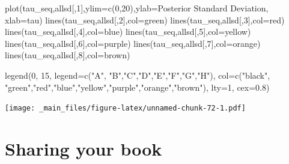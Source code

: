 \documentclass[
]{book}
\newenvironment{Shaded}{\begin{snugshade}}{\end{snugshade}}
\newcommand{\AttributeTok}[1]{\textcolor[rgb]{0.77,0.63,0.00}{#1}}
\newcommand{\DecValTok}[1]{\textcolor[rgb]{0.00,0.00,0.81}{#1}}
\newcommand{\FloatTok}[1]{\textcolor[rgb]{0.00,0.00,0.81}{#1}}
\newcommand{\FunctionTok}[1]{\textcolor[rgb]{0.00,0.00,0.00}{#1}}
\newcommand{\NormalTok}[1]{#1}
\newcommand{\StringTok}[1]{\textcolor[rgb]{0.31,0.60,0.02}{#1}}
\theoremstyle{definition}
\theoremstyle{definition}
\theoremstyle{definition}
\theoremstyle{definition}
\theoremstyle{remark}
\begin{document}
\begin{Shaded}
\begin{Highlighting}[]
\FunctionTok{plot}\NormalTok{(tau\_seq,allsd[,}\DecValTok{1}\NormalTok{],}\AttributeTok{ylim=}\FunctionTok{c}\NormalTok{(}\DecValTok{0}\NormalTok{,}\DecValTok{20}\NormalTok{),}\AttributeTok{ylab=}\StringTok{\textquotesingle{}Posterior Standard Deviation\textquotesingle{}}\NormalTok{, }\AttributeTok{xlab=}\StringTok{\textquotesingle{}tau\textquotesingle{}}\NormalTok{)}
\FunctionTok{lines}\NormalTok{(tau\_seq,allsd[,}\DecValTok{2}\NormalTok{],}\AttributeTok{col=}\StringTok{\textquotesingle{}green\textquotesingle{}}\NormalTok{)}
\FunctionTok{lines}\NormalTok{(tau\_seq,allsd[,}\DecValTok{3}\NormalTok{],}\AttributeTok{col=}\StringTok{\textquotesingle{}red\textquotesingle{}}\NormalTok{)}
\FunctionTok{lines}\NormalTok{(tau\_seq,allsd[,}\DecValTok{4}\NormalTok{],}\AttributeTok{col=}\StringTok{\textquotesingle{}blue\textquotesingle{}}\NormalTok{)}
\FunctionTok{lines}\NormalTok{(tau\_seq,allsd[,}\DecValTok{5}\NormalTok{],}\AttributeTok{col=}\StringTok{\textquotesingle{}yellow\textquotesingle{}}\NormalTok{)}
\FunctionTok{lines}\NormalTok{(tau\_seq,allsd[,}\DecValTok{6}\NormalTok{],}\AttributeTok{col=}\StringTok{\textquotesingle{}purple\textquotesingle{}}\NormalTok{)}
\FunctionTok{lines}\NormalTok{(tau\_seq,allsd[,}\DecValTok{7}\NormalTok{],}\AttributeTok{col=}\StringTok{\textquotesingle{}orange\textquotesingle{}}\NormalTok{)}
\FunctionTok{lines}\NormalTok{(tau\_seq,allsd[,}\DecValTok{8}\NormalTok{],}\AttributeTok{col=}\StringTok{\textquotesingle{}brown\textquotesingle{}}\NormalTok{)}

\FunctionTok{legend}\NormalTok{(}\DecValTok{0}\NormalTok{, }\DecValTok{15}\NormalTok{, }
       \AttributeTok{legend=}\FunctionTok{c}\NormalTok{(}\StringTok{"A"}\NormalTok{, }\StringTok{"B"}\NormalTok{,}\StringTok{"C"}\NormalTok{,}\StringTok{"D"}\NormalTok{,}\StringTok{"E"}\NormalTok{,}\StringTok{"F"}\NormalTok{,}\StringTok{"G"}\NormalTok{,}\StringTok{"H"}\NormalTok{),}
       \AttributeTok{col=}\FunctionTok{c}\NormalTok{(}\StringTok{"black"}\NormalTok{, }\StringTok{"green"}\NormalTok{,}\StringTok{"red"}\NormalTok{,}\StringTok{"blue"}\NormalTok{,}\StringTok{"yellow"}\NormalTok{,}\StringTok{"purple"}\NormalTok{,}\StringTok{"orange"}\NormalTok{,}\StringTok{"brown"}\NormalTok{), }\AttributeTok{lty=}\DecValTok{1}\NormalTok{, }\AttributeTok{cex=}\FloatTok{0.8}\NormalTok{)}
\end{Highlighting}
\end{Shaded}

\texttt{[image: \_main\_files/figure-latex/unnamed-chunk-72-1.pdf]}

\hypertarget{sharing-your-book}{%
\chapter{Sharing your book}\label{sharing-your-book}}
\end{document}
